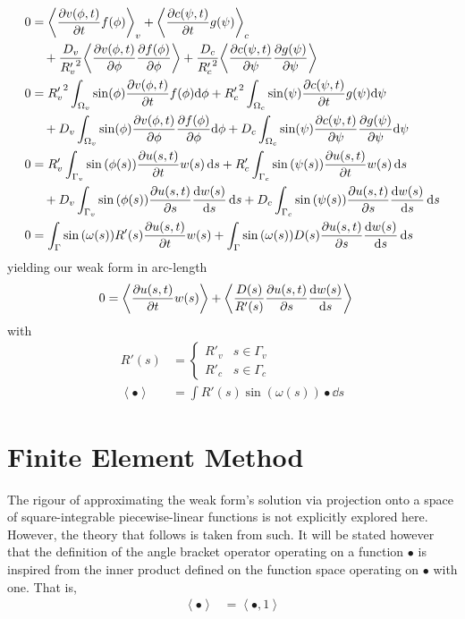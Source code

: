 \documentclass{report}
\newcommand\Par[1]{{ \left({#1}\right) }}
\newcommand\Angle[1]{{ \left\langle{#1}\right\rangle }}
\newcommand\R{{ R' }}
\newcommand\Rc{{ R'_c }}
\newcommand\Rv{{ R'_v }}
\begin{document}
\begin{align*}
	0 &= \Angle{\pdv{v(\phi, t)}{t} f(\phi)}_v
	+ \Angle{\pdv{c(\psi, t)}{t} g(\psi)}_c \\
	&\quad+ \frac{D_v}{\Rv^2} \Angle{\pdv{v(\phi, t)}{\phi} \pdv{f(\phi)}{\phi}}
	+ \frac{D_c}{\Rc^2} \Angle{\pdv{c(\psi, t)}{\psi} \pdv{g(\psi)}{\psi}} \\
	0 &= \Rv^2 \int_{\Omega_v} \sin(\phi) \pdv{v(\phi, t)}{t} f(\phi) \dd\phi
	+ \Rc^2 \int_{\Omega_c} \sin(\psi) \pdv{c(\psi, t)}{t} g(\psi) \dd\psi \\
	&\quad+ D_v \int_{\Omega_v} \sin(\phi) \pdv{v(\phi, t)}{\phi} \pdv{f(\phi)}{\phi} \dd\phi
	+ D_c \int_{\Omega_c} \sin(\psi) \pdv{c(\psi, t)}{\psi} \pdv{g(\psi)}{\psi} \dd\psi \\
	0 &= \Rv \int_{\Gamma_v} \sin\Par{\phi(s)} \pdv{u(s, t)}{t} w(s) \dd{s}
	+ \Rc \int_{\Gamma_c} \sin\Par{\psi(s)} \pdv{u(s, t)}{t} w(s) \dd{s} \\
	&\quad+ D_v \int_{\Gamma_v} \sin\Par{\phi(s)} \pdv{u(s, t)}{s} \dv{w(s)}{s} \dd{s} + D_c \int_{\Gamma_c} \sin\Par{\psi(s)} \pdv{u(s, t)}{s} \dv{w(s)}{s} \dd{s} \\
	0 &= \int_\Gamma \sin\Par{\omega(s)} \R(s) \pdv{u(s, t)}{t} w(s) + \int_\Gamma \sin\Par{\omega(s)} D(s) \pdv{u(s, t)}{s} \dv{w(s)}{s} \dd{s}
\end{align*}
yielding our weak form in arc-length
\begin{align*}
	0 &= \Angle{\pdv{u(s, t)}{t} w(s)} + \Angle{\frac{D(s)}{\R(s)} \pdv{u(s, t)}{s} \dv{w(s)}{s}}
\end{align*}
with
\begin{align*}
	\R(s) &= \begin{cases}
		\Rv & s \in \Gamma_v \\
		\Rc & s \in \Gamma_c
	\end{cases} \\
	\Angle{\bullet} &= \int \R(s) \sin\Par{\omega(s)} \bullet \dd{s}
\end{align*}

\chapter{Finite Element Method}
The rigour of approximating the weak form's solution via projection onto a space of square-integrable piecewise-linear functions is not explicitly explored here. However, the theory that follows is taken from such. It will be stated however that the definition of the angle bracket operator operating on a function $\bullet$ is inspired from the inner product defined on the function space operating on $\bullet$ with one. That is,
\begin{align*}
	\Angle{\bullet} &= \Angle{\bullet, 1}
\end{align*}
\end{document}
